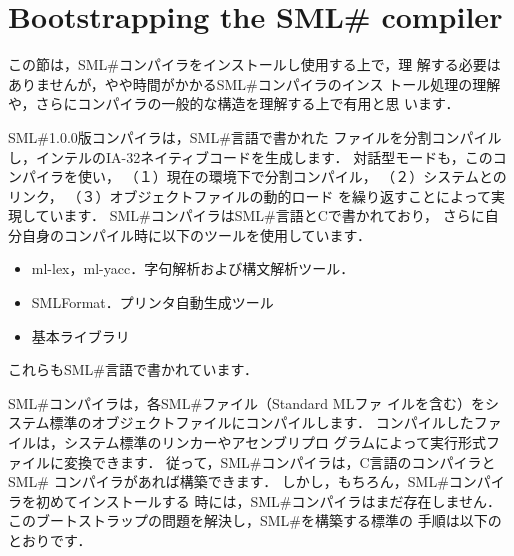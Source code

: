 \documentclass{jbook}
\newcommand{\txt}[2]{#2}
\newcommand{\smlsharp}{SML\#}
\newcommand{\version}{1.0.0}
\begin{document}
\section{
\txt{\smlsharp{}コンパイラの構造とブートストラップ}
    {Bootstrapping the \smlsharp{} compiler }
}
\label{sec:tutorialBootstrap}

\ifx\jp%
	この節は，\smlsharp{}コンパイラをインストールし使用する上で，理
解する必要はありませんが，やや時間がかかる\smlsharp{}コンパイラのインス
トール処理の理解や，さらにコンパイラの一般的な構造を理解する上で有用と思
います．

	\smlsharp{}\version{}版コンパイラは，\smlsharp{}言語で書かれた
ファイルを分割コンパイルし，インテルのIA-32ネイティブコードを生成します．
	対話型モードも，このコンパイラを使い，
（１）現在の環境下で分割コンパイル，
（２）システムとのリンク，
（３）オブジェクトファイルの動的ロード
を繰り返すことによって実現しています．
	\smlsharp{}コンパイラは\smlsharp{}言語とCで書かれており，
さらに自分自身のコンパイル時に以下のツールを使用しています．
\begin{itemize}
\item ml-lex，ml-yacc．字句解析および構文解析ツール．
\item SMLFormat．プリンタ自動生成ツール
\item 基本ライブラリ
\end{itemize}
	これらも\smlsharp{}言語で書かれています．

	\smlsharp{}コンパイラは，各\smlsharp{}ファイル（Standard MLファ
イルを含む）をシステム標準のオブジェクトファイルにコンパイルします．
	コンパイルしたファイルは，システム標準のリンカーやアセンブリプロ
グラムによって実行形式ファイルに変換できます．
	従って，\smlsharp{}コンパイラは，C言語のコンパイラと\smlsharp{}
コンパイラがあれば構築できます．
	しかし，もちろん，\smlsharp{}コンパイラを初めてインストールする
時には，\smlsharp{}コンパイラはまだ存在しません．
	このブートストラップの問題を解決し，\smlsharp{}を構築する標準の
手順は以下のとおりです．
\end{document}

